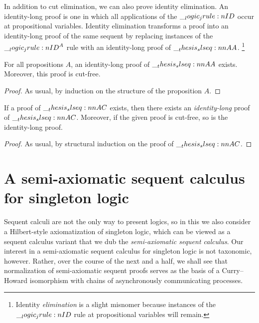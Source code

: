 In addition to cut elimination, we can also prove identity elimination.
An identity-long proof is one in which all applications of the $\__logic_jrule:n {ID}$ occur at propositional variables.
Identity elimination transforms a proof into an identity-long proof of the same sequent by replacing instances of the $\__logic_jrule:n {ID}^A$ rule with an identity-long proof of $\slseq{A |- A}$.%
\footnote{Identity \emph{elimination} is a slight misnomer because instances of the $\__logic_jrule:n {ID}$ rule at propositional variables will remain.}

\begin{lemma}
  For all propositions $A$, an identity-long proof of $\slseq{A |- A}$ exists.
  Moreover, this proof is cut-free.
\end{lemma}
\begin{proof}
  As usual, by induction on the structure of the proposition $A$.
\end{proof}

\begin{theorem}
  If a proof of $\slseq{A |- C}$ exists, then there exists an \emph{identity-long} proof of $\slseq{A |- C}$.
  Moreover, if the given proof is cut-free, so is the identity-long proof.
\end{theorem}
\begin{proof}
  As usual, by structural induction on the proof of $\slseq{A |- C}$.
\end{proof}


\section{A semi-axiomatic sequent calculus for singleton logic}\label{sec:singleton-logic:hilbert}\label{sec:singleton-logic:sax}

Sequent calculi are not the only way to present logics, so
in this  we also consider a Hilbert-style axiomatization of singleton logic, which can be viewed as a sequent calculus variant that we dub the \emph{semi-axiomatic sequent calculus}\autocite{DeYoung+:FSCD20}.
Our interest in a semi-axiomatic sequent calculus for singleton logic is not taxonomic, however.
Rather, over the course of the next  and a half, we shall see that normalization of semi-axiomatic sequent proofs serves as the basis of a Curry--Howard isomorphism with chains of asynchronously communicating processes.

